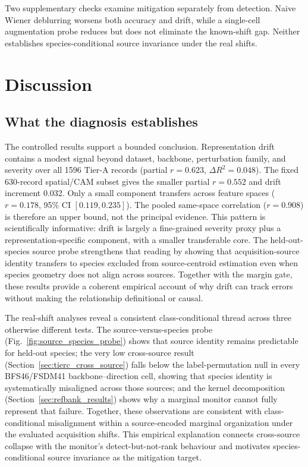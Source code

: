 \documentclass[a4paper,fleqn]{els-cas-templates/cas-sc}
\begin{document}
Two supplementary checks examine mitigation separately from detection. Naive
Wiener deblurring worsens both accuracy and drift, while a
single-cell augmentation probe reduces but does not eliminate the known-shift
gap. Neither establishes species-conditional source invariance under the real
shifts.

\FloatBarrier

\section{Discussion}

\subsection{What the diagnosis establishes}

The controlled results support a bounded conclusion. Representation drift
contains a modest signal beyond dataset, backbone, perturbation family, and
severity over all 1596 Tier-A records (partial $r=0.623$,
$\Delta R^2=0.048$). The fixed 630-record spatial/CAM subset gives the smaller
partial $r=0.552$ and drift increment 0.032. Only a small component transfers across feature
spaces ($r=0.178$, 95\% CI $[0.119,0.235]$). The pooled same-space correlation
($r=0.908$) is therefore an upper bound, not the principal evidence. This pattern
is scientifically informative: drift is largely a fine-grained severity proxy
plus a representation-specific component, with a smaller transferable core.
The held-out-species source probe strengthens that reading by showing that
acquisition-source identity transfers to species excluded from source-centroid
estimation even when species geometry does not align across sources. Together
with the margin gate, these results provide a coherent
empirical account of why drift can track errors without making the relationship
definitional or causal.

The real-shift analyses reveal a consistent class-conditional thread across three
otherwise different tests. The source-versus-species probe
(Fig.~\ref{fig:source_species_probe}) shows that source identity remains
predictable for held-out species; the very low cross-source result
(Section~\ref{sec:tierc_cross_source}) falls below the label-permutation null
in every BFS46/FSDM41 backbone--direction cell, showing that species identity
is systematically misaligned across those sources; and the kernel decomposition
(Section~\ref{sec:refbank_results}) shows why a marginal monitor cannot fully
represent that failure. Together, these observations are consistent with
class-conditional misalignment within a source-encoded marginal organization
under the evaluated acquisition shifts. This empirical explanation connects
cross-source collapse with the monitor's detect-but-not-rank behaviour and motivates
species-conditional source invariance as the mitigation target.
\end{document}
